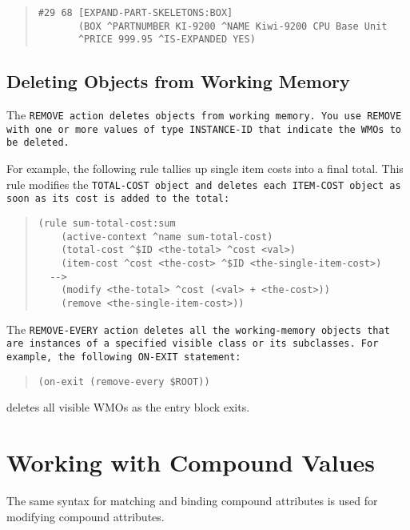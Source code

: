 \begin{quote}
\begin{verbatim}
#29 68 [EXPAND-PART-SKELETONS:BOX] 
       (BOX ^PARTNUMBER KI-9200 ^NAME Kiwi-9200 CPU Base Unit 
       ^PRICE 999.95 ^IS-EXPANDED YES)
\end{verbatim}
\end{quote}

\subsection{Deleting Objects from Working Memory}

The \tt{REMOVE} action deletes objects from working memory. You use
\tt{REMOVE} with one or more values of type \tt{INSTANCE-ID} that
indicate the WMOs to be deleted.

For example, the following rule tallies up single item costs into a
final total. This rule modifies the \tt{TOTAL-COST} object and deletes
each \tt{ITEM-COST} object as soon as its cost is added to the total:

\begin{quote}
\begin{verbatim}
(rule sum-total-cost:sum
    (active-context ^name sum-total-cost)
    (total-cost ^$ID <the-total> ^cost <val>)
    (item-cost ^cost <the-cost> ^$ID <the-single-item-cost>)
  -->
    (modify <the-total> ^cost (<val> + <the-cost>))
    (remove <the-single-item-cost>))
\end{verbatim}
\end{quote}

The \tt{REMOVE-EVERY} action deletes all the working-memory objects
that are instances of a specified visible class or its subclasses. For
example, the following \tt{ON-EXIT} statement:

\begin{quote}
\begin{verbatim}
(on-exit (remove-every $ROOT))
\end{verbatim}
\end{quote}

deletes all visible WMOs as the entry block exits.

\section{Working with Compound Values}

The same syntax for matching and binding compound attributes is used
for modifying compound attributes.

